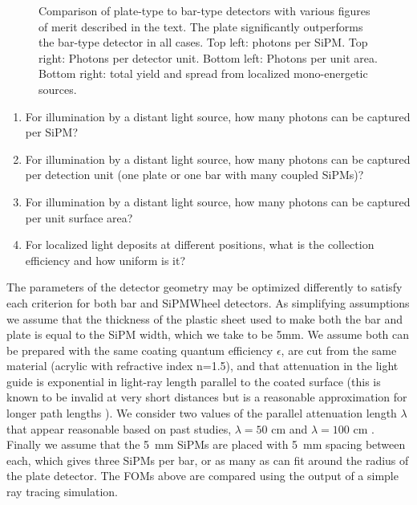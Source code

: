 \begin{figure}[t!]
\begin{centering}
\par\end{centering}

\caption{Comparison of plate-type to bar-type detectors with various figures of merit described in the text.  The plate significantly outperforms the bar-type detector in all cases. Top left: photons per SiPM. Top right: Photons per detector unit. Bottom left: Photons per unit area. Bottom right: total yield and spread from localized mono-energetic sources. \label{fig:FOMs}}
\end{figure}



\begin{enumerate}
\item For illumination by a distant light source, how many photons can be captured per SiPM?  
\item For illumination by a distant light source, how many photons can be captured per detection unit (one plate or one bar with many coupled SiPMs)?  
\item For illumination by a distant light source, how many photons can be captured per unit surface area?  
\item For localized light deposits at different positions, what is the collection efficiency and how uniform is it?
\end{enumerate}

The parameters of the detector geometry may be optimized differently to satisfy each criterion for both bar and SiPMWheel detectors.  As simplifying assumptions we assume that the thickness of the plastic sheet used to make both the bar and plate is equal to the SiPM width, which we take to be 5mm.  We assume both can be prepared with the same coating quantum efficiency $\epsilon$, are cut from the same material (acrylic with refractive index n=1.5), and that attenuation in the light guide is exponential in light-ray length parallel to the coated surface (this is known to be invalid at very short distances but is a reasonable approximation for longer path lengths \cite{Jones:2013sfa}).  We consider two values of the parallel attenuation length $\lambda$ that appear reasonable based on past studies, $\lambda=50$ cm and $\lambda=100$ cm \cite{Moss:2014ota,Jones:2013sfa}.  Finally we assume that the 5~mm SiPMs are placed with 5~mm spacing between each, which gives three SiPMs per bar, or as many as can fit around the radius of the plate detector.  The FOMs above are compared using the output of a simple ray tracing simulation.

